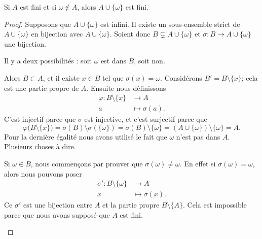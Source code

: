 \begin{proposition}      \label{PROPooVOKDooOStPzU}
	Si \( A\) est fini et si \( \omega\notin A\), alors \( A\cup\{ \omega \}\) est fini.
\end{proposition}

\begin{proof}
	Supposons que \( A\cup\{ \omega \}\) est infini. Il existe un sous-ensemble strict de \( A\cup\{ \omega \}\) en bijection avec \( A\cup\{ \omega \}\). Soient donc \( B\subsetneq A\cup\{ \omega \}\) et \( \sigma\colon B\to A\cup\{ \omega \}\) une bijection.

	Il y a deux possibilités : soit \( \omega\) est dans \( B\), soit non.

	\begin{subproof}
		Alors \( B\subset A\), et il existe \( x\in B\) tel que \( \sigma(x)=\omega\). Considérons \( B'=B\setminus\{ x \}\); cela est une partie propre de \( A\). Ensuite nous définissons
		\begin{equation}
			\begin{aligned}
				\varphi\colon B\setminus\{ x \} & \to A              \\
				a                               & \mapsto \sigma(a).
			\end{aligned}
		\end{equation}
		C'est injectif parce que \( \sigma\) est injective, et c'est surjectif parce que
		\begin{equation}
			\varphi\big( B\setminus\{ x \} \big)=\sigma(B)\setminus\sigma(\{ \omega \})=\sigma(B)\setminus\{ \omega \}=(A\cup\{ \omega \})\setminus\{ \omega \}=A.
		\end{equation}
		Pour la dernière égalité nous avons utilisé le fait que \( \omega\) n'est pas dans \( A\).
		\spitem[Si \( \omega\in B\)]
		Plusieurs choses à dire.
		\begin{subproof}
			\spitem[\( \sigma(\omega)\neq \omega\)]

			Si \( \omega\in B\), nous commençons par prouver que \( \sigma(\omega)\neq \omega\). En effet si \( \sigma(\omega)=\omega\), alors nous pouvons poser
			\begin{equation}
				\begin{aligned}
					\sigma'\colon B\setminus\{ \omega \} & \to A              \\
					x                                    & \mapsto \sigma(x).
				\end{aligned}
			\end{equation}
			Ce \( \sigma'\) est une bijection entre \( A\) et la partie propre \( B\setminus \{ A \}\). Cela est impossible parce que nous avons supposé que \( A\) est fini.


\end{subproof}
\end{subproof}
\end{proof}
